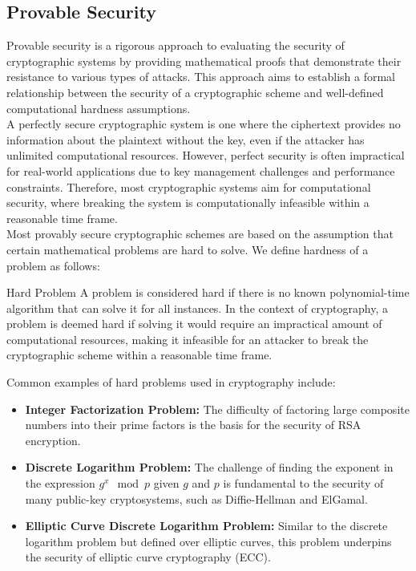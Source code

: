 \documentclass[openany]{book}
\begin{document}
\subsection{Provable Security}
Provable security is a rigorous approach to evaluating the security of cryptographic systems by providing mathematical proofs that demonstrate their resistance to various types of attacks. This approach aims to establish a formal relationship between the security of a cryptographic scheme and well-defined computational hardness assumptions. \\
A perfectly secure cryptographic system is one where the ciphertext provides no information about the plaintext without the key, even if the attacker has unlimited computational resources. However, perfect security is often impractical for real-world applications due to key management challenges and performance constraints. Therefore, most cryptographic systems aim for computational security, where breaking the system is computationally infeasible within a reasonable time frame. \\
Most provably secure cryptographic schemes are based on the assumption that certain mathematical problems are hard to solve. We define hardness of a problem as follows:
\begin{mydefinition}{Hard Problem}
A problem is considered hard if there is no known polynomial-time algorithm that can solve it for all instances. In the context of cryptography, a problem is deemed hard if solving it would require an impractical amount of computational resources, making it infeasible for an attacker to break the cryptographic scheme within a reasonable time frame.
\end{mydefinition}
Common examples of hard problems used in cryptography include:
\begin{itemize}
    \item \textbf{Integer Factorization Problem:} The difficulty of factoring large composite numbers into their prime factors is the basis for the security of RSA encryption.
    \item \textbf{Discrete Logarithm Problem:} The challenge of finding the exponent in the expression \( g^x \mod p \) given \( g \) and \( p \) is fundamental to the security of many public-key cryptosystems, such as Diffie-Hellman and ElGamal.
    \item \textbf{Elliptic Curve Discrete Logarithm Problem:} Similar to the discrete logarithm problem but defined over elliptic curves, this problem underpins the security of elliptic curve cryptography (ECC).
\end{itemize}
\end{document}
